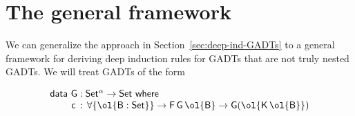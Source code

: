 \documentclass[sigplan,10pt]{acmart}
\begin{document}
\vspace*{-0.05in}

\section{The general framework}\label{sec:framework}

We can generalize the approach in Section~\ref{sec:deep-ind-GADTs} to
a general framework for deriving deep induction rules for GADTs that
are not truly nested GADTs. We will treat GADTs of the form

\vspace*{-0.05in}

\begin{equation}\label{eq:gadts}
\begin{array}{l}
  \mathsf{data\ G : Set^\alpha
    \to Set\ where}\\
\mathsf{\;\;\;\;\;\;\;\;c\, :\, \forall \{\ol{B : Set}\} \to F\,G\,\ol{B} \to G (\ol{K\,\ol{B}})}
\end{array}
\end{equation}
\end{document}
